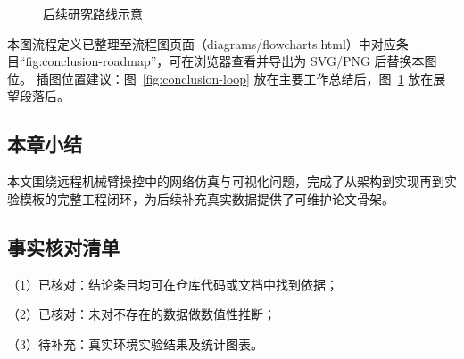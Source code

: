 \begin{figure}[htbp]
\centering
{}
\caption{后续研究路线示意}
\label{fig:conclusion-roadmap}
\end{figure}

\noindent 本图流程定义已整理至流程图页面（diagrams/flowcharts.html）中对应条目“fig:conclusion-roadmap”，可在浏览器查看并导出为 SVG/PNG 后替换本图位。
\noindent 插图位置建议：图~\ref{fig:conclusion-loop} 放在主要工作总结后，图~\ref{fig:conclusion-roadmap} 放在展望段落后。

\subsection{本章小结}
本文围绕远程机械臂操控中的网络仿真与可视化问题，完成了从架构到实现再到实验模板的完整工程闭环，为后续补充真实数据提供了可维护论文骨架。

\subsection{事实核对清单}
（1）已核对：结论条目均可在仓库代码或文档中找到依据；

（2）已核对：未对不存在的数据做数值性推断；

（3）待补充：真实环境实验结果及统计图表。
